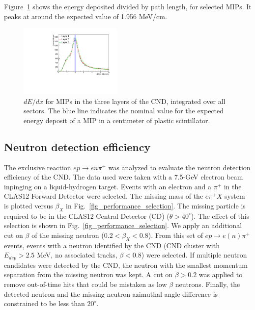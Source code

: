 Figure~\ref{fig_performance_edep} shows the energy deposited divided by path length, for selected MIPs. It peaks at around the expected value of 1.956 MeV/cm.

\begin{figure}[htb]  
\begin{center}
\includegraphics[width=0.45\textwidth]{Figure/canENE.pdf}
\caption {$dE/dx$ for MIPs in the three layers of the CND, integrated over all sectors. The blue line indicates the nominal value for the expected energy deposit of a MIP in a centimeter of plastic scintillator.}
\label{fig_performance_edep}
\end{center}
\end{figure}

\subsection{Neutron detection efficiency}
The exclusive reaction $e p \rightarrow e n \pi^+$ was analyzed to evaluate the neutron detection efficiency of the CND. The data used were taken with a 7.5-GeV electron beam inpinging on a liquid-hydrogen target. Events with an electron and a $\pi^+$ in the CLAS12 Forward Detector were selected. The missing mass of the $e \pi^+ X$ system is plotted versus $\beta_X$ in Fig.~\ref{fig_performance_selection}. The missing particle is required to be in the CLAS12 Central Detector (CD) ($\theta>40^\circ$). The effect of this selection is shown in Fig.~\ref{fig_performance_selection}. We apply an additional cut on $\beta$ of the missing neutron ($0.2<\beta_X<0.8$). From this set of $e p \rightarrow e (n) \pi^+$ events, events with a neutron identified by the CND (CND cluster with $E_{dep}>2.5$ MeV, no associated tracks, $\beta<0.8$) were selected. If multiple neutron candidates were detected by the CND, the neutron with the smallest momentum separation from the missing neutron was kept. A cut on $\beta>0.2$ was applied to remove out-of-time hits that could be mistaken as low $\beta$ neutrons. Finally, the detected neutron and the missing neutron azimuthal angle difference is constrained to be less than $20^\circ$.

